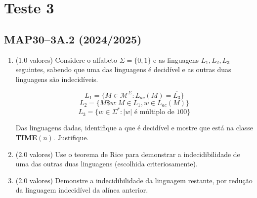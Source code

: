 \documentclass[a4paper,12pt]{article}
\begin{document}
\vspace{1.0cm}
\section*{Teste 3}

\subsection*{MAP30–3A.2 (2024/2025)}
\begin{enumerate}[label=\alph*)]
  \item (1.0 valores) Considere o alfabeto \(\Sigma = \{0, 1\}\) e as linguagens \(L_1, L_2, L_3\) seguintes, sabendo que uma das linguagens é decidível e as outras duas linguagens são indecidíveis.

  \[L_1 = \{M \in \mathcal{M}^\Sigma : L_{ac}(M) = \overline{L_3}\}\]
  \[L_2 = \{M \$ w : M \in L_1, w \in L_{ac}(M)\}\]
  \[L_3 = \{w \in \Sigma^* : |w| \text{ é múltiplo de } 100\}\]
  
  Das linguagens dadas, identifique a que é decidível e mostre que está na classe \textbf{TIME}\((n)\). Justifique.

  \item (2.0 valores) Use o teorema de Rice para demonstrar a indecidibilidade de uma das outras duas linguagens (escolhida criteriosamente).

  \item (2.0 valores) Demonstre a indecidibilidade da linguagem restante, por redução da linguagem indecidível da alínea anterior.
\end{enumerate}
\end{document}
